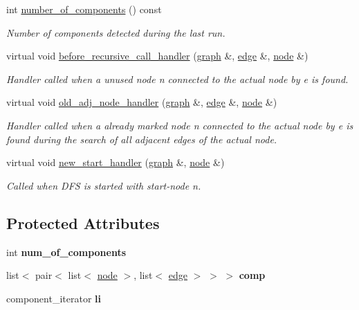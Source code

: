 \begin{DoxyCompactItemize}
int \mbox{\hyperlink{classcomponents_ad3206d2d050ed7719f7140ea3bee81f8}{number\+\_\+of\+\_\+components}} () const
\begin{DoxyCompactList}\small\item\em Number of components detected during the last run. \end{DoxyCompactList}\item 
virtual void \mbox{\hyperlink{classcomponents_a587a9c44a80deb4260ccd0728bfeab0f}{before\+\_\+recursive\+\_\+call\+\_\+handler}} (\mbox{\hyperlink{classgraph}{graph}} \&, \mbox{\hyperlink{classedge}{edge}} \&, \mbox{\hyperlink{classnode}{node}} \&)
\begin{DoxyCompactList}\small\item\em Handler called when a unused node {\itshape n} connected to the actual node by {\itshape e} is found. \end{DoxyCompactList}\item 
virtual void \mbox{\hyperlink{classcomponents_afcf7a0bee5104bba7986039a9d6bd1ee}{old\+\_\+adj\+\_\+node\+\_\+handler}} (\mbox{\hyperlink{classgraph}{graph}} \&, \mbox{\hyperlink{classedge}{edge}} \&, \mbox{\hyperlink{classnode}{node}} \&)
\begin{DoxyCompactList}\small\item\em Handler called when a already marked node {\itshape n} connected to the actual node by {\itshape e} is found during the search of all adjacent edges of the actual node. \end{DoxyCompactList}\item 
virtual void \mbox{\hyperlink{classcomponents_af53365bd737b34cf63e4a6b10879ffcc}{new\+\_\+start\+\_\+handler}} (\mbox{\hyperlink{classgraph}{graph}} \&, \mbox{\hyperlink{classnode}{node}} \&)
\begin{DoxyCompactList}\small\item\em Called when D\+FS is started with start-\/node {\itshape n}. \end{DoxyCompactList}\end{DoxyCompactItemize}
\subsection*{Protected Attributes}
\begin{DoxyCompactItemize}
\item 
\mbox{\label{classcomponents_ad5a54d7313e23f8c6a2c6347e6ee70a0}} 
int {\bfseries num\+\_\+of\+\_\+components}
\item 
\mbox{\label{classcomponents_a8ea32e0ef95a2d707b88cfa80209d357}} 
list$<$ pair$<$ list$<$ \mbox{\hyperlink{classnode}{node}} $>$, list$<$ \mbox{\hyperlink{classedge}{edge}} $>$ $>$ $>$ {\bfseries comp}
\item 
\mbox{\label{classcomponents_ae88ffb062b1ea4931ecfaa53e871825f}} 
component\+\_\+iterator {\bfseries li}
\end{DoxyCompactItemize}



